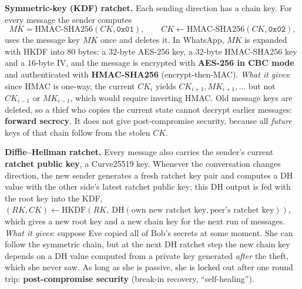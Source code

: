 \textbf{Symmetric-key (KDF) ratchet.} Each sending direction has a chain key. For every message the sender computes
\[
MK = \mathrm{HMAC\text{-}SHA256}(CK, \texttt{0x01}), \qquad CK \leftarrow \mathrm{HMAC\text{-}SHA256}(CK, \texttt{0x02}),
\]
uses the message key $MK$ once and deletes it. In WhatsApp, $MK$ is expanded with HKDF into 80 bytes: a 32-byte AES-256 key, a 32-byte HMAC-SHA256 key and a 16-byte IV, and the message is encrypted with \textbf{AES-256 in CBC mode} and authenticated with \textbf{HMAC-SHA256} (encrypt-then-MAC). \emph{What it gives}: since HMAC is one-way, the current $CK_i$ yields $CK_{i+1}, MK_{i+1}, \dots$ but not $CK_{i-1}$ or $MK_{i-1}$, which would require inverting HMAC. Old message keys are deleted, so a thief who copies the current state cannot decrypt earlier messages: \textbf{forward secrecy}. It does not give post-compromise security, because all \emph{future} keys of that chain follow from the stolen $CK$.

\textbf{Diffie--Hellman ratchet.} Every message also carries the sender's current \textbf{ratchet public key}, a Curve25519 key. Whenever the conversation changes direction, the new sender generates a fresh ratchet key pair and computes a DH value with the other side's latest ratchet public key; this DH output is fed with the root key into the KDF, $(RK, CK) \leftarrow \mathrm{HKDF}(RK,\ \mathrm{DH}(\text{own new ratchet key}, \text{peer's ratchet key}))$, which gives a new root key and a new chain key for the next run of messages. \emph{What it gives}: suppose Eve copied all of Bob's secrets at some moment. She can follow the symmetric chain, but at the next DH ratchet step the new chain key depends on a DH value computed from a private key generated \emph{after} the theft, which she never saw. As long as she is passive, she is locked out after one round trip: \textbf{post-compromise security} (break-in recovery, ``self-healing'').

